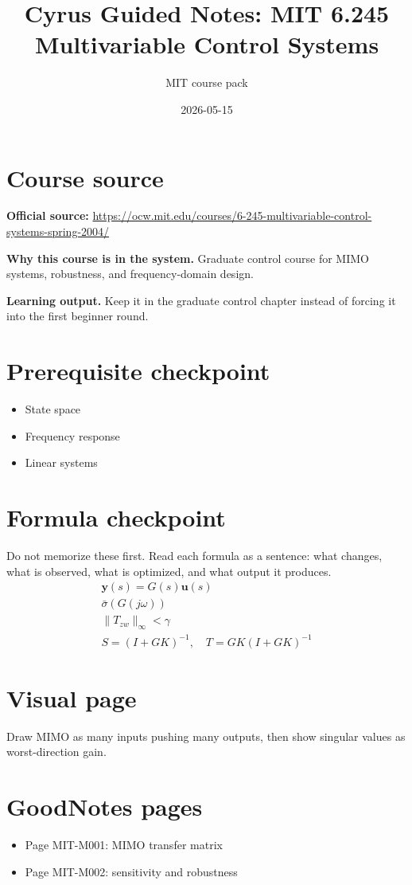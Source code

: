 \documentclass[11pt]{article}
\title{Cyrus Guided Notes: MIT 6.245 Multivariable Control Systems}
\author{MIT course pack}
\date{2026-05-15}
\begin{document}
\maketitle

\section*{Course source}
\textbf{Official source:} \url{https://ocw.mit.edu/courses/6-245-multivariable-control-systems-spring-2004/}

\textbf{Why this course is in the system.} Graduate control course for MIMO systems, robustness, and frequency-domain design.

\textbf{Learning output.} Keep it in the graduate control chapter instead of forcing it into the first beginner round.

\section*{Prerequisite checkpoint}
\begin{itemize}[leftmargin=1.4em]
  \item State space
  \item Frequency response
  \item Linear systems
\end{itemize}

\section*{Formula checkpoint}
Do not memorize these first. Read each formula as a sentence: what changes, what is observed, what is optimized, and what output it produces.
\begin{align*}
  \bm{y}(s)=G(s)\bm{u}(s)\\
  \bar{\sigma}(G(j\omega))\\
  \|T_{zw}\|_{\infty}<\gamma\\
  S=(I+GK)^{-1},\quad T=GK(I+GK)^{-1}
\end{align*}

\section*{Visual page}
Draw MIMO as many inputs pushing many outputs, then show singular values as worst-direction gain.

\section*{GoodNotes pages}
\begin{itemize}[leftmargin=1.4em]
  \item Page MIT-M001: MIMO transfer matrix
  \item Page MIT-M002: sensitivity and robustness
\end{itemize}
\end{document}
